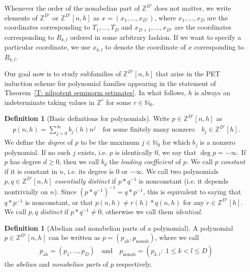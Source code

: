 \documentclass[11pt]{amsart}
\theoremstyle{definition}
\newtheorem{definition}[lemma]{Definition}
\newcommand{\N}{{\mathbb N}}
\newcommand{\Z}{{\mathbb Z}}
\newcommand{\CQ}{{\mathcal Q}}
\newcommand{\inv}{^{-1}}
\newcommand{\1}{{\mathbf{1}}}
\newcommand{\ab}{{\mathrm{ab}}}
\newcommand{\nonab}{{\mathrm{nonab}}}
\begin{document}
    Whenever the order of the nonabelian part of $\Z^{D'}$ does not matter, we write elements of $\Z^{D'}$ or $\Z^{D'}[n,h]$ as $x = (x_1, \ldots, x_{D'})$, where $x_1, \ldots, x_D$ are the coordinates corresponding to $T_1, \ldots, T_D$ and $x_{D+1}, \ldots, x_{D'}$ are the coordinates corresponding to $R_{k,l}$ ordered in some arbitrary fashion. If we want to specify a particular coordinate, we use $x_{k,l}$ to denote the coordinate of $x$ corresponding to $R_{k,l}.$




Our goal now is to study subfamilies of $\Z^{D'}[n,h]$ 
that arise in the PET induction scheme for polynomial families appearing in the statement of Theorem~\ref{T: nilpotent seminorm estimates}. In what follows, $h$ is always an indeterminate taking values in $\Z^{r}$ for some $r\in\N_0$. 
\begin{definition}[Basic definitions for polynomials]\label{d61}
Write $p\in\Z^{D'}[n,h]$ as 
\begin{align*}
    p(n,h) = \sum_{j=0}^\infty b_j(h)n^j \quad \textrm{for some {finitely many nonzero}}\quad b_j\in \Z^{D'}[h].
\end{align*}
We define the \textit{degree} of $p$ to be the maximum $j\in\N_0$ for which $b_j$ is a nonzero polynomial. If no such $j$ exists, i.e. $p$ is identically 0, we say that $\deg p  = - \infty$. If $p$ has degree $d\geq 0$, then we call $b_d$ the \textit{leading coefficient} of $p$. We call $p$ \textit{constant} if it is constant in $n$, i.e. its degree is 0 or $-\infty$. 
We call two polynomials $p,q\in\Z^{D'}[n,h]$ \textit{essentially distinct} if $p*q\inv$ is nonconstant (i.e. it depends nontrivially on $n$). Since $(p*q\inv)\inv = q*p\inv$, this is equivalent to saying that $q*p\inv$ is nonconstant, or that $p(n,h) \neq  r(h)*q(n,h)$ for any $r\in \Z^{D'}[h]$. %
We call $p,q$ \textit{distinct} if $p*q\inv\neq 0$, otherwise we call them \textit{identical}.
    
\end{definition}


\begin{definition}[Abelian and nonabelian parts of a polynomial]
    A polynomial $p\in\Z^{D'}[n,h]$ can be written as $p=(p_\ab, p_\nonab)$, where we call 
    \begin{align*}
     p_\ab = (p_1, \ldots, p_D)\quad \textrm{and} \quad p_\nonab = (p_{k,l}\colon\; 1\leq k<l\leq D)   
    \end{align*}
    the \textit{abelian} and \textit{nonabelian parts} of $p$ respectively.
\end{definition}
\end{document}
